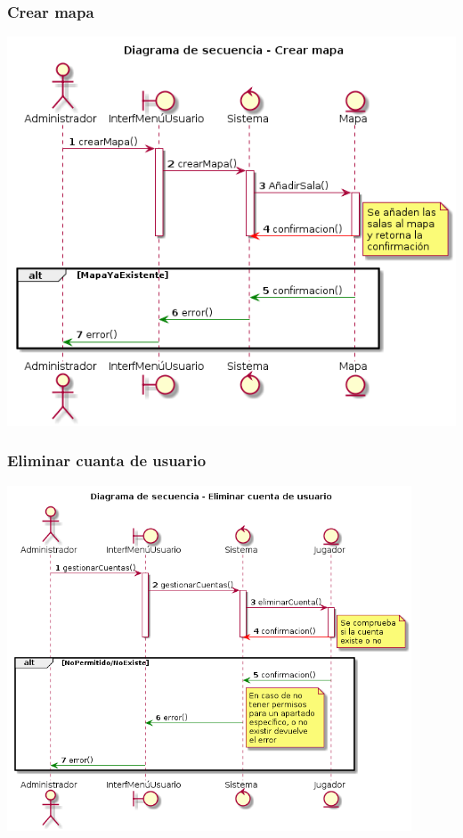 \subsubsection{Crear mapa}
\begin{center}
  \includegraphics[width=1\textwidth]{./imatges/administrador/Crear_mapa.png}
  \end{center}
  
\subsubsection{Eliminar cuanta de usuario}
\begin{center}
  \includegraphics[width=0.9\textwidth]{./imatges/administrador/Eliminar_cuenta_de_usuario.png}
  \end{center}
  
